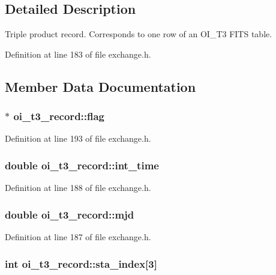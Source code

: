 \subsection{Detailed Description}
Triple product record. Corresponds to one row of an OI\_\-T3 FITS table. 

Definition at line 183 of file exchange.h.



\subsection{Member Data Documentation}
\hypertarget{structoi__t3__record_a0c8d9d803d3c33282b4cd3724704d45f}{
\subsubsection[{flag}]{$\ast$ {\bf oi\_\-t3\_\-record::flag}}}
\label{structoi__t3__record_a0c8d9d803d3c33282b4cd3724704d45f}


Definition at line 193 of file exchange.h.

\hypertarget{structoi__t3__record_a37ec157938438afcbd02a7acfad075a7}{
\subsubsection[{int\_\-time}]{\setlength{\rightskip}{0pt plus 5cm}double {\bf oi\_\-t3\_\-record::int\_\-time}}}
\label{structoi__t3__record_a37ec157938438afcbd02a7acfad075a7}


Definition at line 188 of file exchange.h.

\hypertarget{structoi__t3__record_a5ff8517d65d53869a62eab55fed270c5}{
\subsubsection[{mjd}]{\setlength{\rightskip}{0pt plus 5cm}double {\bf oi\_\-t3\_\-record::mjd}}}
\label{structoi__t3__record_a5ff8517d65d53869a62eab55fed270c5}


Definition at line 187 of file exchange.h.

\hypertarget{structoi__t3__record_adbc855db3a317e574e9c0ad3af4c5f56}{
\subsubsection[{sta\_\-index}]{\setlength{\rightskip}{0pt plus 5cm}int {\bf oi\_\-t3\_\-record::sta\_\-index}\mbox{[}3\mbox{]}}}
\label{structoi__t3__record_adbc855db3a317e574e9c0ad3af4c5f56}


